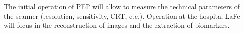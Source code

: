 The initial operation of PEP will allow to measure the technical parameters of the scanner (resolution, sensitivity, CRT, etc.). Operation at the hospital LaFe will focus in the reconstruction of images and the extraction of biomarkers. 


